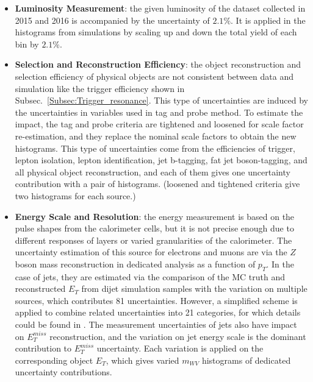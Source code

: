\begin{itemize}
	\item{\bf Luminosity Measurement}: the given luminosity of the dataset collected in 2015 and 2016 is accompanied by the uncertainty of $2.1\%$. It is applied in the histograms from simulations by scaling up and down the total yield of each bin by $2.1\%$.

	\item{\bf Selection and Reconstruction Efficiency}: the object reconstruction and selection efficiency of physical objects are not consistent between data and simulation like the trigger efficiency shown in Subsec.~\ref{Subsec:Trigger_resonance}. This type of uncertainties are induced by the uncertainties in variables used in tag and probe method. To estimate the impact, the tag and probe criteria are tightened and loosened for scale factor re-estimation, and they replace the nominal scale factors to obtain the new histograms. This type of uncertainties come from the efficiencies of trigger, lepton isolation, lepton identification, jet b-tagging, fat jet boson-tagging, and all physical object reconstruction, and each of them gives one uncertainty contribution with a pair of histograms. (loosened and tightened criteria give two histograms for each source.)

	\item{\bf Energy Scale and Resolution}: the energy measurement is based on the pulse shapes from the calorimeter cells, but it is not precise enough due to different responses of layers or varied granularities of the calorimeter. The uncertainty estimation of this source for electrons and muons are via the $Z$ boson mass reconstruction in dedicated analysis as a function of $p_{T}$. In the case of jets, they are estimated via the comparison of the MC truth and reconstructed $E_{T}$ from dijet simulation samples with the variation on multiple sources, which contributes 81 uncertainties. However, a simplified scheme is applied to combine related uncertainties into 21 categories, for which details could be found in \cite{Herde:2059849}. The measurement uncertainties of jets also have impact on $E^{miss}_{T}$ reconstruction, and the variation on jet energy scale is the dominant contribution to $E^{miss}_{T}$ uncertainty. Each variation is applied on the corresponding object $E_{T}$, which gives varied $m_{WV}$ histograms of dedicated uncertainty contributions.


\end{itemize}
